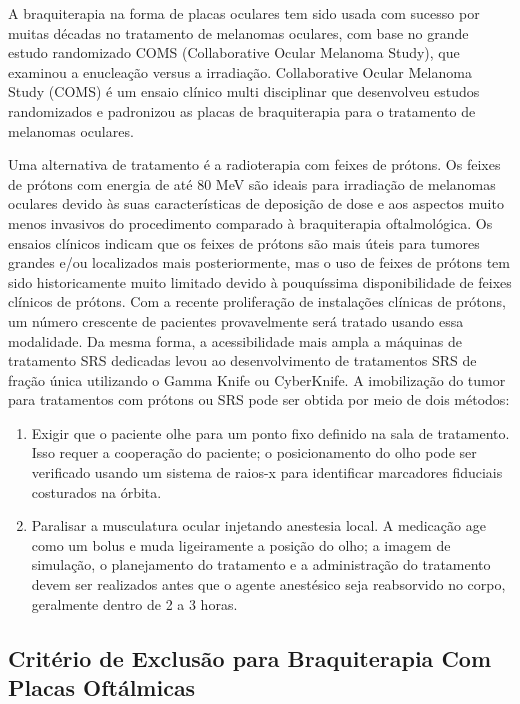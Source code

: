 \documentclass[11pt,a4paper]{article}
\begin{document}
    A braquiterapia na forma de placas oculares tem sido usada com sucesso por muitas décadas no tratamento de melanomas oculares, com base no grande estudo randomizado COMS (Collaborative Ocular Melanoma Study), que examinou a enucleação versus a irradiação.  Collaborative Ocular Melanoma Study (COMS) é um ensaio clínico multi disciplinar que desenvolveu estudos randomizados e padronizou as placas de braquiterapia para o tratamento de melanomas oculares.
    
    Uma alternativa de tratamento é a radioterapia com feixes de prótons. Os feixes de prótons com energia de até 80 MeV são ideais para irradiação de melanomas oculares devido às suas características de deposição de dose e aos aspectos muito menos invasivos do procedimento comparado à braquiterapia oftalmológica. Os ensaios clínicos indicam que os feixes de prótons são mais úteis para tumores grandes e/ou localizados mais posteriormente, mas o uso de feixes de prótons tem sido historicamente muito limitado devido à pouquíssima disponibilidade de feixes clínicos de prótons. Com a recente proliferação de instalações clínicas de prótons, um número crescente de pacientes provavelmente será tratado usando essa modalidade. Da mesma forma, a acessibilidade mais ampla a máquinas de tratamento SRS dedicadas levou ao desenvolvimento de tratamentos SRS de fração única utilizando o Gamma Knife ou CyberKnife. A imobilização do tumor para tratamentos com prótons ou SRS pode ser obtida por meio de dois métodos:

    \begin{enumerate}
        \item Exigir que o paciente olhe para um ponto fixo definido na sala de tratamento. Isso requer a cooperação do paciente; o posicionamento do olho pode ser verificado usando um sistema de raios-x para identificar marcadores fiduciais costurados na órbita.
        \item Paralisar a musculatura ocular injetando anestesia local. A medicação age como um bolus e muda ligeiramente a posição do olho; a imagem de simulação, o planejamento do tratamento e a administração do tratamento devem ser realizados antes que o agente anestésico seja reabsorvido no corpo, geralmente dentro de 2 a 3 horas.
    \end{enumerate}
    

\subsection*{Critério de Exclusão para Braquiterapia Com Placas Oftálmicas}
\end{document}
